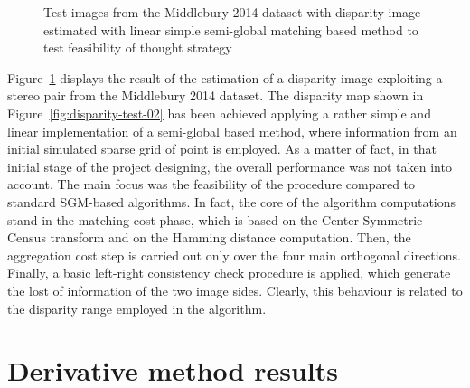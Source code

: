 \begin{figure}[t]
	\centering
\caption{Test images from the Middlebury 2014 dataset with disparity image estimated with linear simple semi-global matching based method to test feasibility of thought strategy}
\label{fig:test-matlab-02}
\end{figure}

Figure~\ref{fig:test-matlab-02} displays the result of the estimation of a disparity image exploiting a stereo pair from the Middlebury 2014 dataset.
The disparity map shown in Figure~\ref{fig:disparity-test-02} has been achieved applying a rather simple and linear implementation of a semi-global based method, where information from an initial simulated sparse grid of point is employed.
As a matter of fact, in that initial stage of the project designing, the overall performance was not taken into account.
The main focus was the feasibility of the procedure compared to standard SGM-based algorithms. 
In fact, the core of the algorithm computations stand in the matching cost phase, which is based on the Center-Symmetric Census transform and on the Hamming distance computation.
Then, the aggregation cost step is carried out only over the four main orthogonal directions.
Finally, a basic left-right consistency check procedure is applied, which generate the lost of information of the two image sides.
Clearly, this behaviour is related to the disparity range employed in the algorithm.

\section{Derivative method results}
\label{section:der-method-results}

